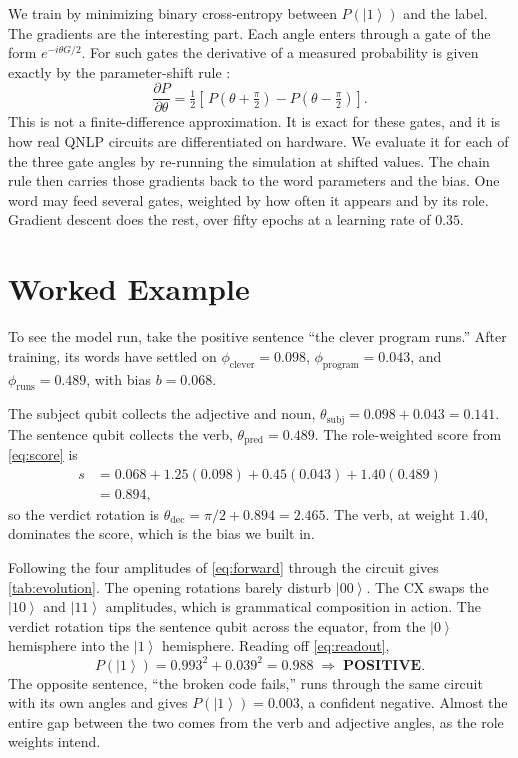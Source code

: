 \documentclass{article}
\newcommand{\ket}[1]{\left|#1\right\rangle}
\begin{document}
We train by minimizing binary cross-entropy between $P(\ket{1})$ and the label.
The gradients are the interesting part. Each angle enters through a gate of the
form $e^{-i\theta G/2}$. For such gates the derivative of a measured probability
is given exactly by the parameter-shift rule
\citep{mitarai2018quantum,schuld2019evaluating}:
\begin{equation}
  \frac{\partial P}{\partial\theta}
  = \tfrac12\!\left[\,
      P\!\left(\theta + \tfrac{\pi}{2}\right)
    - P\!\left(\theta - \tfrac{\pi}{2}\right)
    \right].
  \label{eq:psr}
\end{equation}
This is not a finite-difference approximation. It is exact for these gates, and
it is how real QNLP circuits are differentiated on hardware. We evaluate it for
each of the three gate angles by re-running the simulation at shifted values. The
chain rule then carries those gradients back to the word parameters and the bias.
One word may feed several gates, weighted by how often it appears and by its role.
Gradient descent does the rest, over fifty epochs at a learning rate of $0.35$.

\section{Worked Example}
\label{sec:walkthrough}

To see the model run, take the positive sentence ``the clever program runs.''
After training, its words have settled on $\phi_\text{clever}=0.098$,
$\phi_\text{program}=0.043$, and $\phi_\text{runs}=0.489$, with bias $b=0.068$.

The subject qubit collects the adjective and noun,
$\theta_\mathrm{subj}=0.098+0.043=0.141$. The sentence qubit collects the verb,
$\theta_\mathrm{pred}=0.489$. The role-weighted score from \cref{eq:score} is
\begin{align*}
  s &= 0.068 + 1.25(0.098) + 0.45(0.043) + 1.40(0.489) \\
    &= 0.894,
\end{align*}
so the verdict rotation is $\theta_\mathrm{dec}=\pi/2 + 0.894 = 2.465$. The verb,
at weight $1.40$, dominates the score, which is the bias we built in.

Following the four amplitudes of \cref{eq:forward} through the circuit gives
\cref{tab:evolution}. The opening rotations barely disturb $\ket{00}$. The CX
swaps the $\ket{10}$ and $\ket{11}$ amplitudes, which is grammatical composition
in action. The verdict rotation tips the sentence qubit across the equator, from
the $\ket{0}$ hemisphere into the $\ket{1}$ hemisphere. Reading off
\cref{eq:readout},
\begin{equation*}
  P(\ket{1}) = 0.993^2 + 0.039^2 = 0.988
  \;\Rightarrow\; \textbf{POSITIVE}.
\end{equation*}
The opposite sentence, ``the broken code fails,'' runs through the same circuit
with its own angles and gives $P(\ket{1}) = 0.003$, a confident negative. Almost
the entire gap between the two comes from the verb and adjective angles, as the
role weights intend.
\end{document}

